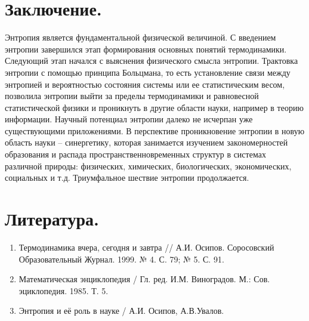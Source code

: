 \documentclass[bachelor, och, referat ]{SCWorks}
\begin{document}
\section*{Заключение.}
Энтропия является фундаментальной физической величиной. С введением энтропии завершился этап формирования основных понятий термодинамики. Следующий этап начался с выяснения физического смысла энтропии. Трактовка энтропии с помощью принципа Больцмана, то есть установление связи между энтропией и вероятностью состояния системы или ее статистическим весом, позволила энтропии выйти за пределы термодинамики и равновесной статистической физики и проникнуть в другие области науки, например в теорию информации.
Научный потенциал энтропии далеко не исчерпан уже существующими приложениями. В перспективе проникновение энтропии в новую область науки – синергетику, которая занимается изучением закономерностей образования и распада пространственновременных структур в системах различной природы: физических, химических, биологических, экономических, социальных и т.д. Триумфальное шествие энтропии продолжается.
 

\newpage

\section*{Литература.}
\begin{enumerate}
\item{Термодинамика вчера, сегодня и завтра // А.И. Осипов. Соросовский Образовательный Журнал. 1999. № 4. С. 79; № 5. С. 91.}
\item{Математическая энциклопедия / Гл. ред. И.М. Виноградов. М.: Сов. эциклопедия. 1985. Т. 5. }
\item{Энтропия и её роль в науке / А.И. Осипов, А.В.Увалов.}
\end{enumerate}
\end{document}
